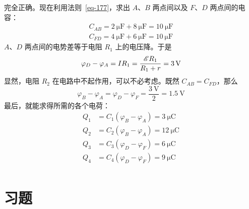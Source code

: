 \begin{dialogue}
\tchr 完全正确。现在利用法则~\eqref{eq-177}，求出 $A$、$B$ 两点间以及 $F$、$D$ 两点间的电容：
\begin{eqnarray*}%
C_{AB} = \SI{2}{\micro\farad} + \SI{8}{\micro\farad} =  \SI{10}{\micro\farad} \\
C_{FD} = \SI{4}{\micro\farad} + \SI{6}{\micro\farad} =  \SI{10}{\micro\farad}
\end{eqnarray*}
$A$、$D$ 两点间的电势差等于电阻 $R_{1}$ 上的电压降。于是
\begin{equation*}%
\varphi_{D} - \varphi_{A} = IR_{1} = \frac{\Ea R_{1}}{R_{1} + r} = \SI{3}{\volt}
\end{equation*}
显然，电阻 $R_{2}$ 在电路中不起作用，可以不必考虑。既然 $C_{AB} = C_{FD}$，那么
\begin{equation*}%
\varphi_{B} - \varphi_{A} = \varphi_{D} - \varphi_{F} = \dfrac{\SI{3}{\volt}}{2} = \SI{1.5}{\volt}
\end{equation*}
最后，就能求得所需的各个电荷：
\begin{align*}%
Q_{1} &= C_{1}(\varphi_{B} - \varphi_{A}) =  \SI{3}{\micro\coulomb} \\
Q_{2} &= C_{2}(\varphi_{B} - \varphi_{A}) =  \SI{12}{\micro\coulomb} \\
Q_{3} &= C_{3}(\varphi_{D} - \varphi_{F}) =  \SI{6}{\micro\coulomb}\\
Q_{4} &= C_{4}(\varphi_{D} - \varphi_{F}) =  \SI{9}{\micro\coulomb} \\
\end{align*}
\end{dialogue}

\section*{习题}
\label{prob-28}

